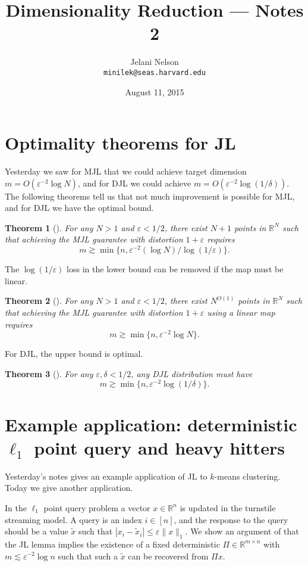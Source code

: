 \documentclass[12pt]{article}
\author{Jelani Nelson\\{}\texttt{minilek@seas.harvard.edu}}
\title{Dimensionality Reduction --- Notes 2}
\date{August 11, 2015}
\newcommand{\eps}{\varepsilon}
\newcommand{\R}{\mathbb{R}}
\newtheorem{theorem}{Theorem}
\begin{document}
\maketitle

\section{Optimality theorems for JL}

Yesterday we saw for MJL that we could achieve target dimension $m = O(\eps^{-2}\log N)$, and for DJL we could achieve $m = O(\eps^{-2}\log(1/\delta))$. The following theorems tell us that not much improvement is possible for MJL, and for DJL we have the optimal bound.

\begin{theorem}[\cite{Alon03}]
For any $N>1$ and $\eps<1/2$, there exist $N+1$ points in $\R^N$ such that achieving the MJL guarantee with distortion $1+\eps$ requires
$$
m\gtrsim \min\{n, \eps^{-2}(\log N)/\log(1/\eps)\} .
$$
\end{theorem}

The $\log(1/\eps)$ loss in the lower bound can be removed if the map must be linear.

\begin{theorem}[\cite{LarsenN14}]
For any $N>1$ and $\eps<1/2$, there exist $N^{O(1)}$ points in $\R^N$ such that achieving the MJL guarantee with distortion $1+\eps$ {\em using a linear map} requires
$$
m\gtrsim \min\{n, \eps^{-2} \log N\} .
$$
\end{theorem}

For DJL, the upper bound is optimal.

\begin{theorem}[\cite{JayramW13, KaneMN11}]
For any $\eps,\delta<1/2$, any DJL distribution must have
$$
m\gtrsim \min\{n, \eps^{-2}\log(1/\delta)\} .
$$
\end{theorem}

\section{Example application: deterministic $\ell_1$ point query and heavy hitters}

Yesterday's notes gives an example application of JL to $k$-means clustering. Today we give another application.

In the {$\ell_1$ point query problem} a vector $x\in\R^n$ is updated in the turnstile streaming model. A query is an index $i\in[n]$, and the response to the query should be a value $\tilde{x}$ such that $|x_i - \tilde{x}_i| \le \eps\|x\|_1$. We show an argument of \cite{NelsonNW14} that the JL lemma implies the existence of a fixed deterministic $\Pi\in\R^{m\times n}$ with $m \lesssim \eps^{-2}\log n$ such that such a $\tilde{x}$ can be recovered from $\Pi x$.
\end{document}
